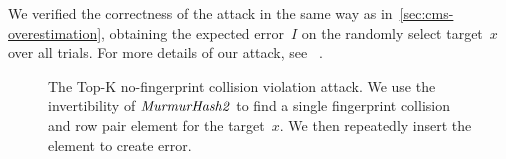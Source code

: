 We verified the correctness of the attack in the same way as in~\cref{sec:cms-overestimation}, obtaining the expected error~$I$  on the randomly select target~$x$ over all trials. For more details of our attack, see ~.

\begin{figure}[htp]
    \centering
    \begin{pcvstack}
    \end{pcvstack}	
\caption[Redis TK NFC Violation Attack.]{The Top-K no-fingerprint collision violation attack. We use the invertibility of $\mathit{MurmurHash2}$ to find a single fingerprint collision and row pair element for the target~$x$. We then repeatedly insert the element to create error.}\label{fig:tk-nfc-attack}
\end{figure}